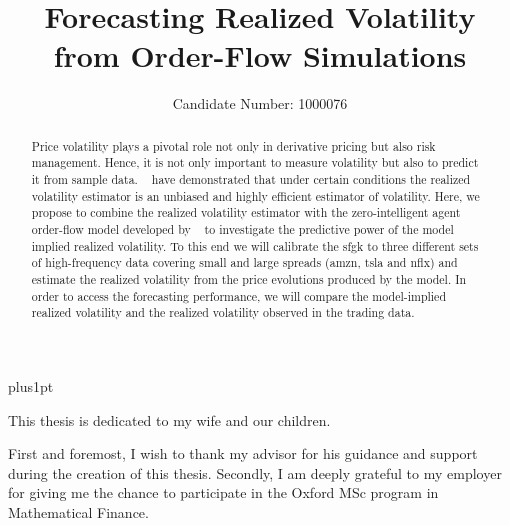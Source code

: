 \documentclass[11pt, a4paper]{thesis}  %
\title{Forecasting Realized Volatility \\[1ex]
		from Order-Flow Simulations}   %
\author{Candidate Number: 1000076}             %
\begin{document}
\baselineskip=18pt plus1pt

\setcounter{secnumdepth}{3}
\setcounter{tocdepth}{3}

\maketitle                  %

%
%

\begin{dedication}
This thesis is dedicated to my wife and our children. \\
\end{dedication}

%
%

\begin{acknowledgements}
First and foremost, I wish to thank my advisor for his guidance
and support during the creation of this thesis. Secondly, I am deeply grateful to my
employer for giving me the chance to participate in the Oxford MSc program
in Mathematical Finance.
\end{acknowledgements}

%
%

\begin{abstract}
Price volatility plays a pivotal role not only in derivative pricing but also risk management. Hence, it is not only important to measure volatility but also to predict it from sample data. \citeauthor{Anderson:2000:GreatRealisations}~\cite{Andersen:1998cb, Anderson:2000:GreatRealisations,Andersen:2001:RealizedVol} have demonstrated that under certain conditions the realized volatility estimator is an unbiased and highly efficient estimator of volatility. Here, we propose to combine the realized volatility estimator with the zero-intelligent agent order-flow model developed by \citeauthor{Smith:2003:StatisticalModel}~\cite{Smith:2003:StatisticalModel} to investigate the predictive power of the model implied realized volatility. To this end we will calibrate the \ac{sfgk} to three different sets of high-frequency data covering small and large spreads (\ac{amzn}, \ac{tsla} and \ac{nflx}) and estimate the realized volatility from the price evolutions produced by the model. In order to access the forecasting performance, we will compare the  model-implied realized volatility and the realized volatility observed in the trading data.
\end{abstract}
\end{document}
